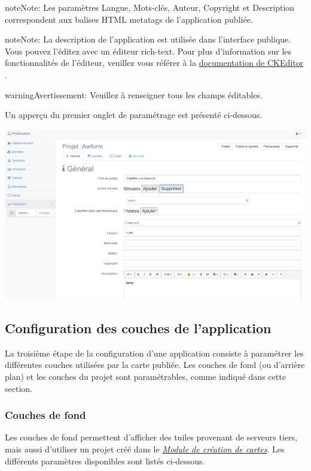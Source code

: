 \documentclass[letterpaper,10pt,french]{sphinxmanual}
\begin{document}
\begin{notice}{note}{Note:}
Les paramètres Langue, Mots-clés, Auteur, Copyright et Description correspondent aux balises HTML metatags de l'application publiée.
\end{notice}

\begin{notice}{note}{Note:}
La description de l'application est utilisée dans l'interface publique. Vous pouvez l'éditez avec un éditeur rich-text. Pour plus d'information sur les fonctionnalités de l'éditeur, veuillez vous référer à la \href{http://docs.cksource.com/Main\_Page}{documentation de CKEditor} .
\end{notice}

\begin{notice}{warning}{Avertissement:}
Veuillez à renseigner tous les champs éditables.
\end{notice}

Un apperçu du premier onglet de paramétrage est présenté ci-dessous.

\includegraphics[width=1.000\linewidth]{publisher-main-conf.png}


\subsection{Configuration des couches de l'application}
\label{apps/appconfig:configuration-des-couches-de-l-application}
La troisième étape de la configuration d'une application consiste à paramétrer les différentes couches utilisées par la carte publiée.
Les couches de fond (ou d'arrière plan) et les couches du projet sont paramétrables, comme indiqué dans cette section.


\subsubsection{Couches de fond}
\label{apps/appconfig:couches-de-fond}
Les couches de fond permettent d'afficher des tuiles provenant de serveurs tiers, mais aussi d'utiliser un projet créé dans le {\hyperref[maps/index::doc]{\emph{\emph{Module de création de cartes}}}}. Les différents paramètres disponibles sont listés ci-dessous.
\end{document}
